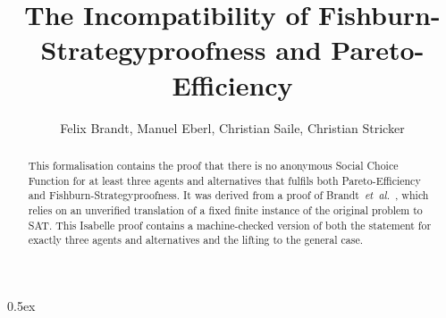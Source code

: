 \documentclass[11pt,a4paper]{article}
\begin{document}
\title{The Incompatibility of Fishburn-Strategyproofness and Pareto-Efficiency}
\author{Felix Brandt, Manuel Eberl, Christian Saile, Christian Stricker}
\maketitle

\begin{abstract}
This formalisation contains the proof that there is no anonymous Social Choice Function for at least three agents and alternatives that fulfils both Pareto-Efficiency and Fishburn-Strategyproofness. It was derived from a proof of Brandt\ \textit{et~al.}~\cite{BSS17a}, which relies on an unverified translation of a fixed finite instance of the original problem to SAT. This Isabelle proof contains a machine-checked version of both the statement for exactly three agents and alternatives and the lifting to the general case.
\end{abstract}

\tableofcontents

\parindent 0pt\parskip 0.5ex
\newpage





\end{document}

